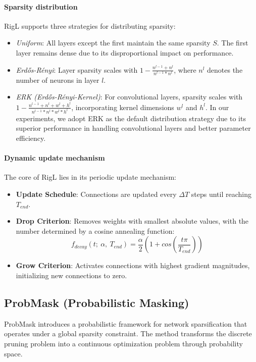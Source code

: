 \paragraph{Sparsity distribution} RigL supports three strategies for distributing sparsity:
\begin{itemize}
    \item \textit{Uniform}: All layers except the first maintain the same sparsity $S$. The first layer remains dense due to its disproportional impact on performance.
    \item \textit{Erdős-Rényi}: Layer sparsity scales with $1- \frac{n^{l-1}+n^{l}}{n^{l-1} * n^{l}}$, where $n^l$ denotes the number of neurons in layer $l$.
    \item \textit{ERK (Erdős-Rényi-Kernel)}: For convolutional layers, sparsity scales with $1- \frac{n^{l-1}+n^{l}+w^l+h^l}{n^{l-1} * n^{l}*w^l*h^l}$, incorporating kernel dimensions $w^l$ and $h^l$. In our experiments, we adopt ERK as the default distribution strategy due to its superior performance in handling convolutional layers and better parameter efficiency.
\end{itemize}

\paragraph{Dynamic update mechanism} The core of RigL lies in its periodic update mechanism:
\begin{itemize}
    \item \textbf{Update Schedule}: Connections are updated every $\Delta T$ steps until reaching $T_{end}$.
    \item \textbf{Drop Criterion}: Removes weights with smallest absolute values, with the number determined by a cosine annealing function:
    $$f_{decay}(t;~\alpha,~T_{end})=\frac{\alpha}{2}\left(1+cos\left(\frac{t\pi}{T_{end}}\right)\right)$$
    \item \textbf{Grow Criterion}: Activates connections with highest gradient magnitudes, initializing new connections to zero.
\end{itemize}

\subsection{ProbMask (Probabilistic Masking)}
ProbMask introduces a probabilistic framework for network sparsification that operates under a global sparsity constraint. The method transforms the discrete pruning problem into a continuous optimization problem through probability space.

